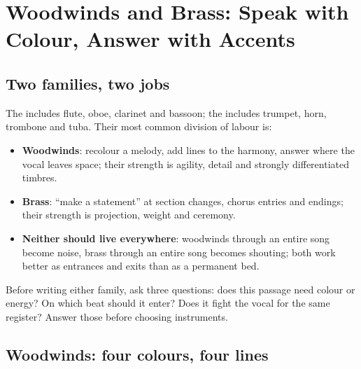 \chapter{Woodwinds and Brass: Speak with Colour, Answer with Accents}
\label{ch:winds-brass}


\section{Two families, two jobs}
\label{sec:winds-jobs}

The  includes flute, oboe, clarinet and bassoon; the  includes trumpet, horn, trombone and tuba. Their most common division of labour is:

\begin{itemize}
\item \textbf{Woodwinds}: recolour a melody, add lines to the harmony, answer where the vocal leaves space; their strength is agility, detail and strongly differentiated timbres.
\item \textbf{Brass}: ``make a statement'' at section changes, chorus entries and endings; their strength is projection, weight and ceremony.
\item \textbf{Neither should live everywhere}: woodwinds through an entire song become noise, brass through an entire song becomes shouting; both work better as entrances and exits than as a permanent bed.
\end{itemize}

Before writing either family, ask three questions: does this passage need colour or energy? On which beat should it enter? Does it fight the vocal for the same register? Answer those before choosing instruments.

\section{Woodwinds: four colours, four lines}
\label{sec:woodwinds}

